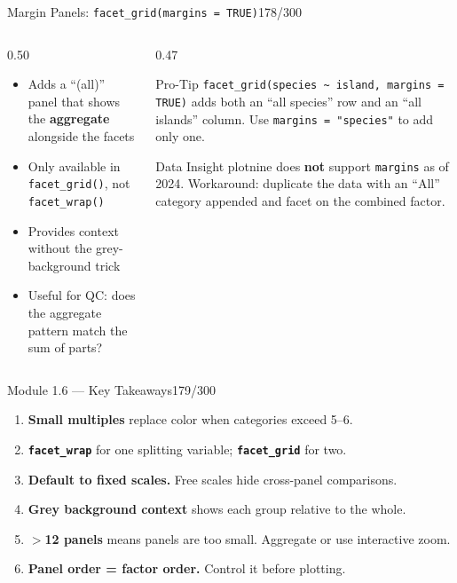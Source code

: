 \documentclass[10pt]{beamer}
\newcommand{\smark}[1]{\hfill{\scriptsize\color{codegray}#1}}
\begin{document}
\begin{frame}{Margin Panels: \texttt{facet\_grid(margins = TRUE)}}\smark{178/300}
\begin{columns}[T]
\begin{column}{0.50\textwidth}
\begin{itemize}
    \item Adds a ``(all)'' panel that shows the \textbf{aggregate} alongside the facets
    \item Only available in \texttt{facet\_grid()}, not \texttt{facet\_wrap()}
    \item Provides context without the grey-background trick
    \item Useful for QC: does the aggregate pattern match the sum of parts?
\end{itemize}
\end{column}
\begin{column}{0.47\textwidth}
\begin{alertblock}{Pro-Tip}
    \scriptsize \texttt{facet\_grid(species \textasciitilde\ island, margins = TRUE)} adds both an ``all species'' row and an ``all islands'' column. Use \texttt{margins = "species"} to add only one.
\end{alertblock}
\vspace{0.2cm}
\begin{exampleblock}{Data Insight}
    \scriptsize plotnine does \textbf{not} support \texttt{margins} as of 2024. Workaround: duplicate the data with an ``All'' category appended and facet on the combined factor.
\end{exampleblock}
\end{column}
\end{columns}
\end{frame}

\begin{frame}{Module 1.6 --- Key Takeaways}\smark{179/300}
\begin{enumerate}
    \item \textbf{Small multiples} replace color when categories exceed 5--6.
    \item \textbf{\texttt{facet\_wrap}} for one splitting variable; \textbf{\texttt{facet\_grid}} for two.
    \item \textbf{Default to fixed scales.} Free scales hide cross-panel comparisons.
    \item \textbf{Grey background context} shows each group relative to the whole.
    \item \textbf{$>$12 panels} means panels are too small. Aggregate or use interactive zoom.
    \item \textbf{Panel order = factor order.} Control it before plotting.
\end{enumerate}
\end{frame}
\end{document}
